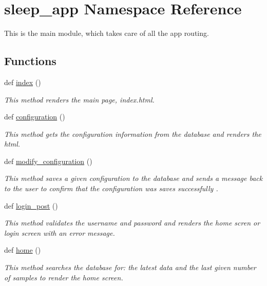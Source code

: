 \hypertarget{namespacesleep__app}{}\section{sleep\+\_\+app Namespace Reference}
\label{namespacesleep__app}


This is the main module, which takes care of all the app routing.  


\subsection*{Functions}
\begin{DoxyCompactItemize}
\item 
def \hyperlink{namespacesleep__app_a92175618197dfd5a2bc1f0602338bc24}{index} ()
\begin{DoxyCompactList}\small\item\em This method renders the main page, index.\+html. \end{DoxyCompactList}\item 
def \hyperlink{namespacesleep__app_a7276ce3776474c5713c6520ac8890157}{configuration} ()
\begin{DoxyCompactList}\small\item\em This method gets the configuration information from the database and renders the html. \end{DoxyCompactList}\item 
def \hyperlink{namespacesleep__app_a0ddb2183d8ac02c3105ae375d4122f6a}{modify\+\_\+configuration} ()
\begin{DoxyCompactList}\small\item\em This method saves a given configuration to the database and sends a message back to the user to confirm that the configuration was saves successfully . \end{DoxyCompactList}\item 
def \hyperlink{namespacesleep__app_a2db458b1854fa62b07151e53ba65648f}{login\+\_\+post} ()
\begin{DoxyCompactList}\small\item\em This method validates the username and password and renders the home scren or login screen with an error message. \end{DoxyCompactList}\item 
def \hyperlink{namespacesleep__app_a921ff5b865384fe3031e92b421c17680}{home} ()
\begin{DoxyCompactList}\small\item\em This method searches the database for\+: the latest data and the last given number of samples to render the home screen. \end{DoxyCompactList}\item 

\end{DoxyCompactItemize}
